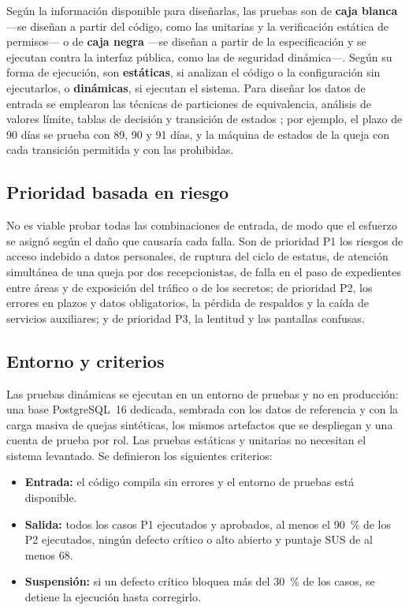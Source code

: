 	Según la información disponible para diseñarlas, las pruebas son de \textbf{caja blanca} ---se
	diseñan a partir del código, como las unitarias y la verificación estática de permisos--- o de
	\textbf{caja negra} ---se diseñan a partir de la especificación y se ejecutan contra la interfaz
	pública, como las de seguridad dinámica---. Según su forma de ejecución, son
	\textbf{estáticas}, si analizan el código o la configuración sin ejecutarlos, o
	\textbf{dinámicas}, si ejecutan el sistema. Para diseñar los datos de entrada se emplearon las
	técnicas de particiones de equivalencia, análisis de valores límite, tablas de decisión y transición
	de estados \cite{myers_testing}; por ejemplo, el plazo de 90 días se prueba con 89, 90 y 91 días, y
	la máquina de estados de la queja con cada transición permitida y con las prohibidas.

	\subsection{Prioridad basada en riesgo}
	No es viable probar todas las combinaciones de entrada, de modo que el esfuerzo se asignó según el
	daño que causaría cada falla. Son de prioridad P1 los riesgos de acceso indebido a datos personales,
	de ruptura del ciclo de estatus, de atención simultánea de una queja por dos recepcionistas, de falla
	en el paso de expedientes entre áreas y de exposición del tráfico o de los secretos; de prioridad
	P2, los errores en plazos y datos obligatorios, la pérdida de respaldos y la caída de servicios
	auxiliares; y de prioridad P3, la lentitud y las pantallas confusas.

	\subsection{Entorno y criterios}
	Las pruebas dinámicas se ejecutan en un entorno de pruebas y no en producción: una base PostgreSQL~16
	dedicada, sembrada con los datos de referencia y con la carga masiva de quejas sintéticas, los mismos
	artefactos que se despliegan y una cuenta de prueba por rol. Las pruebas estáticas y unitarias no
	necesitan el sistema levantado. Se definieron los siguientes criterios:

	\begin{itemize}
		\item \textbf{Entrada:} el código compila sin errores y el entorno de pruebas está disponible.
		\item \textbf{Salida:} todos los casos P1 ejecutados y aprobados, al menos el 90~\% de los P2
		ejecutados, ningún defecto crítico o alto abierto y puntaje SUS de al menos 68.
		\item \textbf{Suspensión:} si un defecto crítico bloquea más del 30~\% de los casos, se detiene la
		ejecución hasta corregirlo.
	\end{itemize}

